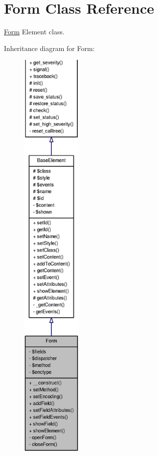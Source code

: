 \section{Form Class Reference}
\label{classForm}


\hyperlink{classForm}{Form} Element class.  




Inheritance diagram for Form:
\nopagebreak
\begin{figure}[H]
\begin{center}
\leavevmode
\includegraphics[height=600pt]{classForm__inherit__graph}
\end{center}
\end{figure}


